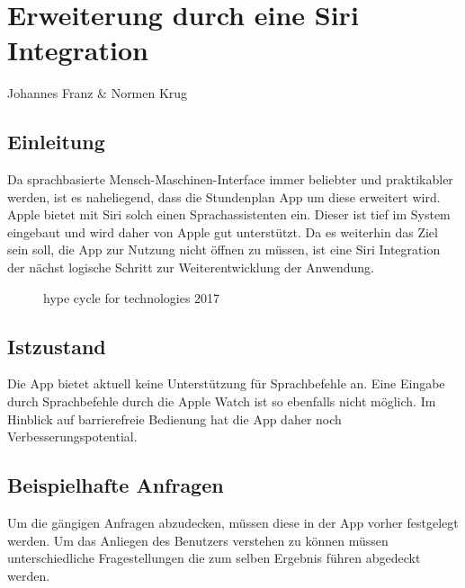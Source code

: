 \chapter{Erweiterung durch eine Siri Integration}
Johannes Franz \& Normen Krug

\section{Einleitung}
Da sprachbasierte Mensch-Maschinen-Interface immer beliebter und praktikabler werden, ist es naheliegend, dass die Stundenplan App um diese erweitert wird. Apple bietet mit Siri solch einen Sprachassistenten ein. Dieser ist tief im System eingebaut und wird daher von Apple gut unterstützt. 
Da es weiterhin das Ziel sein soll, die App zur Nutzung nicht öffnen zu müssen, ist eine Siri Integration der nächst logische Schritt zur Weiterentwicklung der Anwendung.

\begin{figure}[ht]
	\centering
	\caption{hype cycle for technologies 2017}
	\label{fig1}
\end{figure}


\section{Istzustand}
Die App bietet aktuell keine Unterstützung für Sprachbefehle an. Eine Eingabe durch Sprachbefehle durch die Apple Watch ist so ebenfalls nicht möglich. Im Hinblick auf barrierefreie Bedienung hat die App daher noch Verbesserungspotential.

\section{Beispielhafte Anfragen}
Um die gängigen Anfragen abzudecken, müssen diese in der App vorher festgelegt werden. Um das Anliegen des Benutzers verstehen zu können müssen unterschiedliche Fragestellungen die zum selben Ergebnis führen abgedeckt werden.


